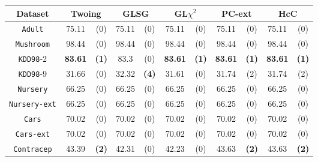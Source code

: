 \begin{table}
\small
\centering
\begin{tabular}{c|cc|cc|cc|cc|cc} 
Dataset             & \multicolumn{2}{c|}{Twoing} &  \multicolumn{2}{c|}{GLSG}  & \multicolumn{2}{c|}{GL$\chi^2$} & \multicolumn{2}{c|}{PC-ext}& \multicolumn{2}{c}{HcC} \\
\hline
{\tt Adult}         &  75.11       & (0)          &  75.11       & (0)          &  75.11       & (0)              & 75.11      & (0)           & 75.11      & (0)        \\
{\tt Mushroom}      &  98.44       & (0)          &  98.44       & (0)          &  98.44       & (0)              & 98.44      & (0)           & 98.44      & (0)        \\
{\tt KDD98}-2       &  {\bf 83.61} & {\bf (1)}    &  83.3        & (0)          &  {\bf 83.61} & {\bf (1)}        &{\bf 83.61} & {\bf (1)}     & {\bf 83.61}& {\bf (1)}  \\
{\tt KDD98}-9       &  31.66       & (0)          &  32.32       & {\bf (4)}    &  31.61       & (0)              & 31.74      & (2)           & 31.74      & (2)        \\
{\tt Nursery}       &  66.25       & (0)          &  66.25       & (0)          &  66.25       & (0)              & 66.25      & (0)           & 66.25      & (0)        \\
{\tt Nursery-ext}   &  66.25       & (0)          &  66.25       & (0)          &  66.25       & (0)              & 66.25      & (0)           & 66.25      & (0)        \\
{\tt Cars}          &  70.02       & (0)          &  70.02       & (0)          &  70.02       & (0)              & 70.02      & (0)           & 70.02      & (0)        \\
{\tt Cars-ext}      &  70.02       & (0)          &  70.02       & (0)          &  70.02       & (0)              & 70.02      & (0)           & 70.02      & (0)        \\
{\tt Contracep}     &  43.39       & {\bf (2)}    &  42.31       & (0)          &  42.23       & (0)              & 43.63      & {\bf (2)}     & 43.63      & {\bf (2)}  \\

\end{tabular}
\end{table}
